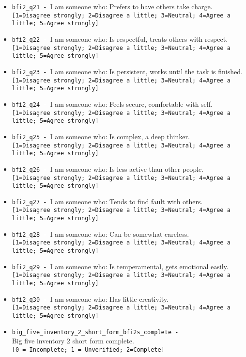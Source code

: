 \begin{description}
\begin{addmargin}[0em]{0em}
\begin{addmargin}[1em]{0em}
\begin{itemize}
            \item \verb|bfi2_q21 - |I am someone who: Prefers to have others take charge.\\\verb|[1=Disagree strongly; 2=Disagree a little; 3=Neutral; 4=Agree a little; 5=Agree strongly]|
            \item \verb|bfi2_q22 - |I am someone who: Is respectful, treats others with respect.\\\verb|[1=Disagree strongly; 2=Disagree a little; 3=Neutral; 4=Agree a little; 5=Agree strongly]|
            \item \verb|bfi2_q23 - |I am someone who: Is persistent, works until the task is finished.\\\verb|[1=Disagree strongly; 2=Disagree a little; 3=Neutral; 4=Agree a little; 5=Agree strongly]|
            \item \verb|bfi2_q24 - |I am someone who: Feels secure, comfortable with self.\\\verb|[1=Disagree strongly; 2=Disagree a little; 3=Neutral; 4=Agree a little; 5=Agree strongly]|
            \item \verb|bfi2_q25 - |I am someone who: Is complex, a deep thinker.\\\verb|[1=Disagree strongly; 2=Disagree a little; 3=Neutral; 4=Agree a little; 5=Agree strongly]|
            \item \verb|bfi2_q26 - |I am someone who: Is less active than other people.\\\verb|[1=Disagree strongly; 2=Disagree a little; 3=Neutral; 4=Agree a little; 5=Agree strongly]|
            \item \verb|bfi2_q27 - |I am someone who: Tends to find fault with others.\\\verb|[1=Disagree strongly; 2=Disagree a little; 3=Neutral; 4=Agree a little; 5=Agree strongly]|
            \item \verb|bfi2_q28 - |I am someone who: Can be somewhat careless.\\\verb|[1=Disagree strongly; 2=Disagree a little; 3=Neutral; 4=Agree a little; 5=Agree strongly]|
            \item \verb|bfi2_q29 - |I am someone who: Is temperamental, gets emotional easily.\\\verb|[1=Disagree strongly; 2=Disagree a little; 3=Neutral; 4=Agree a little; 5=Agree strongly]|
            \item \verb|bfi2_q30 - |I am someone who: Has little creativity.\\\verb|[1=Disagree strongly; 2=Disagree a little; 3=Neutral; 4=Agree a little; 5=Agree strongly]|
            \item \verb|big_five_inventory_2_short_form_bfi2s_complete - |\\Big five inventory 2 short form complete.\\\verb|[0 = Incomplete; 1 = Unverified; 2=Complete]|\\


\end{itemize}
\end{addmargin}
\end{addmargin}
\end{description}
